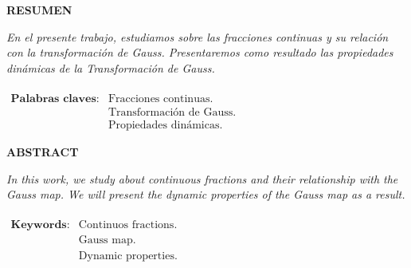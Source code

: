 \documentclass[12pt]{report}
\begin{document}
\newpage
\newpage
\renewcommand{\thepage}{\Roman{page}}
\begin{titlepage}

\begin{flushleft}
{\large \bf RESUMEN}
\end{flushleft}
\textit{En el presente trabajo, estudiamos sobre las fracciones continuas y su relación con la transformación de Gauss. Presentaremos como resultado las propiedades dinámicas de la Transformación de Gauss.}
\\
\\
$\begin{array}{cc} \textbf{Palabras claves:}
     & \text{Fracciones continuas.}  \\
     & \text{Transformación de Gauss.}\\
     & \text{Propiedades dinámicas.}
\end{array}$ %
\end{titlepage}



\begin{titlepage}

\begin{flushleft}

{\large \bf ABSTRACT}
\end{flushleft}
\textit{In this work, we study about continuous fractions and their relationship with the Gauss map. We will present the dynamic properties of the Gauss map as a result.}
\\
\\
$\begin{array}{cc} \textbf{Keywords:}
     & \text{Continuos fractions.}  \\
     & \text{Gauss map.}\\
     & \text{Dynamic properties.}
\end{array}$%
\end{titlepage}

\tableofcontents
\cleardoublepage
\newpage
\end{document}
